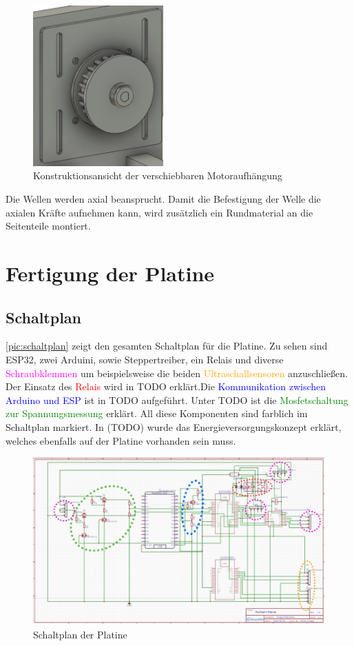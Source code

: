 \begin{figure}[h]
	\centering
	\includegraphics[width=5cm]{motoraufhaengung.png}
	\caption{Konstruktionsansicht der verschiebbaren Motoraufhängung}
	\label{pic:motoraufhaengung}
\end{figure}

Die Wellen werden axial beansprucht. Damit die Befestigung der Welle die axialen Kräfte aufnehmen kann, wird zusätzlich ein Rundmaterial an die Seitenteile montiert. 
\newpage

\chapter{Fertigung der Platine}
\section{Schaltplan}
\label{sec:eCardPlan}
\autoref{pic:schaltplan} zeigt den gesamten Schaltplan für die Platine. Zu sehen sind ESP32, zwei Arduini, sowie Steppertreiber, ein Relais und diverse \textcolor{magenta}{Schraubklemmen} um beispielsweise die beiden \textcolor{orange}{Ultraschallsensoren} anzuschließen. Der Einsatz des \textcolor{red}{Relais} wird in TODO erklärt.Die \textcolor{blue}{Kommunikation zwischen Arduino und ESP} ist in TODO aufgeführt. Unter TODO ist die \textcolor{green}{Mosfetschaltung zur Spannungsmessung} erklärt. All diese Komponenten sind farblich im Schaltplan markiert. In (TODO) wurde das Energieversorgungskonzept erklärt, welches ebenfalls auf der Platine vorhanden sein muss.

\begin{figure}[h]
	\begin{center}
		\includegraphics[width=13.3cm]{schaltplan.jpg}
		\caption{\label{pic:schaltplan} Schaltplan der Platine}
	\end{center}
\end{figure}



